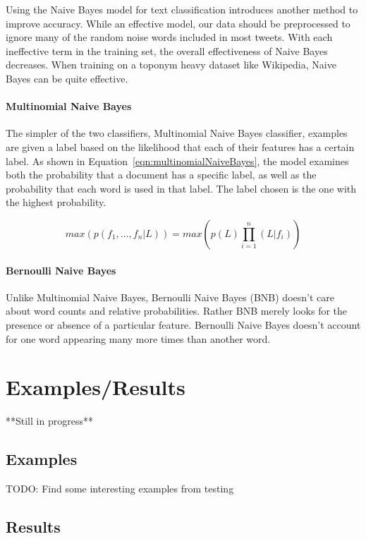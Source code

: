 \documentclass[midd]{thesis}
\begin{document}
Using the Naive Bayes model for text classification introduces another method to improve accuracy. While an effective model, our data should be preprocessed to ignore many of the random noise words included in most tweets. With each ineffective term in the training set, the overall effectiveness of Naive Bayes decreases. When training on a toponym heavy dataset like Wikipedia, Naive Bayes can be quite effective.

\subsubsection{Multinomial Naive Bayes}
The simpler of the two classifiers, Multinomial Naive Bayes classifier, examples are given a label based on the likelihood that each of their features has a certain label. As shown in Equation~\ref{eqn:multinomialNaiveBayes}, the model examines both the probability that a document has a specific label, as well as the probability that each word is used in that label. The label chosen is the one with the highest probability.

\begin{equation}
\label{eqn:multinomialNaiveBayes}
max(p(f_1, \dots, f_n \vert L) )= max(p(L) \prod_{i=1}^n (L|f_i))
\end{equation}

\subsubsection{Bernoulli Naive Bayes}
Unlike Multinomial Naive Bayes, Bernoulli Naive Bayes (BNB) doesn't care about word counts and relative probabilities. Rather BNB merely looks for the presence or absence of a particular feature. Bernoulli Naive Bayes doesn't account for one word appearing many more times than another word.


\chapter{Examples/Results}
**Still in progress**
\section{Examples}
TODO: Find some interesting examples from testing

\section{Results}
\end{document}
